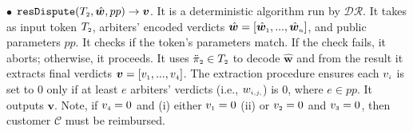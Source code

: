 \begin{definition}
%
\vspace{2mm}
\item  [$\bullet$] $\mathtt{resDispute}(T_{\scriptscriptstyle2}, \hat {\bm w}, pp)\rightarrow {\bm v}$. It is a deterministic algorithm run by $\mathcal {DR}$. It takes as input token $T_{\scriptscriptstyle 2}$,   arbiters' encoded verdicts  $\hat{ \bm{w}}=[\hat{\bm{w}}_{\scriptscriptstyle 1},..., \hat{\bm{w}}_{\scriptscriptstyle n}]$, and public parameters $pp$. It checks if the token's parameters match. If the check fails, it aborts; otherwise, it proceeds. It uses $\ddot \pi_{\scriptscriptstyle 2}\in T_{\scriptscriptstyle 2}$  to decode $\hat {\bm w}$ and from the result it extracts final verdicts $\bm v= [v_{\scriptscriptstyle 1},...,v_{\scriptscriptstyle 4}]$.  The extraction procedure ensures each $v_{\scriptscriptstyle i}$ is set to $0$ only if at least  $e$ arbiters' verdicts (i.e., $w_{\scriptscriptstyle i,j,}$) is $0$, where $e\in pp$.  It outputs $\bm v$. Note, if $v_{\scriptscriptstyle 4}=0$ and (i) either $v_{\scriptscriptstyle 1}=0$ (ii) or $v_{\scriptscriptstyle 2}=0$ and $v_{\scriptscriptstyle 3}=0$, then customer $\mathcal C$ must be reimbursed.
\end{definition}



%





